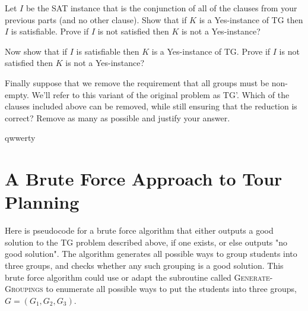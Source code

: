 \documentclass[11pt,fleqn]{exam}
\newif\ifsolutions\solutionsfalse
\newenvironment{soln}{\color{solnblue}}{}
\begin{document}
\begin{questions}
  \ifsolutions
    
  \fi
  \question[3]
  Let $I$ be the SAT instance that is the conjunction of all of the clauses from your previous parts (and no other clause). Show that if $K$ is a Yes-instance of TG then $I$ is satisfiable.
  \begin{soln}
    Prove if $I$ is not satisfied then $K$ is not a Yes-instance?
  \end{soln}
  \ifsolutions
    
  \fi

  \question[3]
  Now show that if $I$ is satisfiable then $K$ is a Yes-instance of TG.
  \begin{soln}
    Prove if $I$ is not satisfied then $K$ is not a Yes-instance?
  \end{soln}
  \ifsolutions
    
  \fi

  \question[4]
  Finally suppose that we remove the requirement that all groups must be non-empty.
  We'll refer to this variant of the original problem as TG'.
  Which of the clauses included above can be removed, while still ensuring that the reduction is correct? Remove as many as possible and justify your answer.

qwwerty

  \ifsolutions
    
  \fi
\end{questions}

\clearpage

\section{A Brute Force Approach to Tour Planning}
Here is pseudocode for a brute force algorithm that either outputs a good solution to the TG problem described above, if one exists, or else outputs "no good solution". The algorithm generates all possible ways to group students into three groups, and checks whether any such grouping is a good solution. This brute force algorithm could use or adapt the subroutine called \textsc{Generate-Groupings} to enumerate all possible ways to put the students into three groups, $G = (G_1,G_2,G_3)$.
\end{document}
